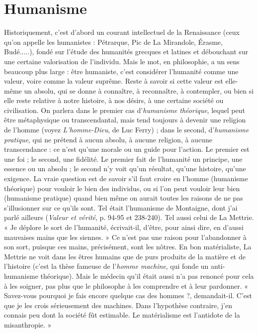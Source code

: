 \section{Humanisme}
Historiquement, c’est d’abord un courant intellectuel de la
Renaissance (ceux qu’on appelle les humanistes : Pétrarque,
Pic de La Mirandole, Érasme, Budé.....), fondé sur l'étude des humanités
grecques et latines et débouchant sur une certaine valorisation de l’individu.
Mais le mot, en philosophie, a un sens beaucoup plus large : être humaniste,
c'est considérer l’humanité comme une valeur, voire comme la valeur suprême.
Reste à savoir si cette valeur est elle-même un absolu, qui se donne à connaître,
à reconnaître, à contempler, ou bien si elle reste relative à notre histoire, à nos
désirs, à une certaine société ou civilisation. On parlera dans le premier cas
d’{\it humanisme théorique}, lequel peut être métaphysique ou transcendantal, mais
tend toujours à devenir une religion de l’homme (voyez {\it L'homme-Dieu}, de Luc
Ferry) ; dans le second, d’{\it humanisme pratique}, qui ne prétend à aucun absolu,
à aucune religion, à aucune transcendance : ce n’est qu’une morale ou un guide
pour l’action. Le premier est une foi ; le second, une fidélité. Le premier fait de
l’humanité un principe, une essence ou un absolu ; le second n’y voit qu’un
résultat, qu’une histoire, qu’une exigence. La vraie question est de savoir s’il
faut croire en l’homme (humanisme théorique) pour vouloir le bien des individus,
ou si l’on peut vouloir leur bien (humanisme pratique) quand bien
même on aurait toutes les raisons de ne pas s’illusionner sur ce qu’ils sont. Tel
était l’humanisme de Montaigne, dont j’ai parlé ailleurs ({\it Valeur et vérité}, p. 94-95
et 238-240). Tel aussi celui de La Mettrie. « Je déplore le sort de l'humanité,
écrivait-il, d’être, pour ainsi dire, en d’aussi mauvaises mains que les siennes. »
Ce n’est pas une raison pour l’abandonner à son sort, puisque ces mains, précisément,
sont les nôtres. En bon matérialiste, La Mettrie ne voit dans les êtres
humains que de purs produits de la matière et de l’histoire (c’est la thèse
fameuse de l’{\it homme machine}, qui fonde un anti-humanisme théorique). Mais
le médecin qu’il était aussi n’a pas renoncé pour cela à les soigner, pas plus que
le philosophe à les comprendre et à leur pardonner. « Savez-vous pourquoi je
fais encore quelque cas des hommes ?, demandait-il. C’est que je les crois
sérieusement des machines. Dans l’hypothèse contraire, j’en connais peu dont
la société fût estimable. Le matérialisme est l’antidote de la misanthropie. »
